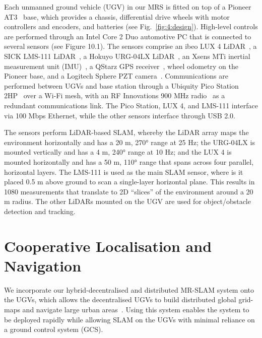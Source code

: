 Each unmanned ground vehicle (UGV) in our MRS is fitted on top of a Pioneer AT3~\cite{adept_technology_inc._pioneer_nodate} base, which provides a chassis, differential drive wheels with motor controllers and encoders, and batteries (see Fig.~\ref{fig:4:design}). High-level controls are performed through an Intel Core 2 Duo automotive PC that is connected to several sensors (see Figure 10.1). The sensors comprise an ibeo LUX 4 LiDAR~\cite{autonomoustuff_ibeo_nodate}, a SICK LMS-111 LiDAR~\cite{sick_ag_lms111-10100_nodate}, a Hokuyo URG-04LX LiDAR~\cite{hokuyo_automatic_co._ltd._scanning_nodate}, an Xsens MTi inertial measurement unit (IMU)~\cite{xsens_mti_nodate}, a QStarz GPS receiver~\cite{qstarz_international_co._ltd._bt-q818xt_nodate}, wheel odometry on the Pioneer base, and a Logitech Sphere PZT camera~\cite{logitech_quickcam_nodate}. Communications are performed between UGVs and base station through a Ubiquity Pico Station 2HP~\cite{ubiquiti_networks_picostation2hp_nodate} over a Wi-Fi mesh, with an RF Innovations 900 MHz radio~\cite{sti_engineering_pty_ltd_rfinnovations_nodate} as a redundant communications link. The Pico Station, LUX 4, and LMS-111 interface via 100 Mbps Ethernet, while the other sensors interface through USB 2.0.


The sensors perform LiDAR-based SLAM, whereby the LiDAR array maps the environment horizontally and has a 20 m, \ang{270} range at 25 Hz; the URG-04LX is mounted vertically and has a 4 m, \ang{240} range at 10 Hz; and the LUX 4 is mounted horizontally and has a 50 m, \ang{110} range that spans across four parallel, horizontal layers. The LMS-111 is used as the main SLAM sensor, where is it placed 0.5 m above ground to scan a single-layer horizontal plane. This results in 1080 measurements that translate to 2D ``slices'' of the environment around a 20 m radius. The other LiDARs mounted on the UGV are used for object/obstacle detection and tracking.

\section{Cooperative Localisation and Navigation}\label{sec:4:cln}
We incorporate our hybrid-decentralised and distributed MR-SLAM system onto the UGVs, which allows the decentralised UGVs to build distributed global grid-maps and navigate large urban areas~\cite{r._reid_large-scale_2011, r._reid_cooperative_2013}. Using this system enables the system to be deployed rapidly while allowing SLAM on the UGVs with minimal reliance on a ground control system (GCS).

